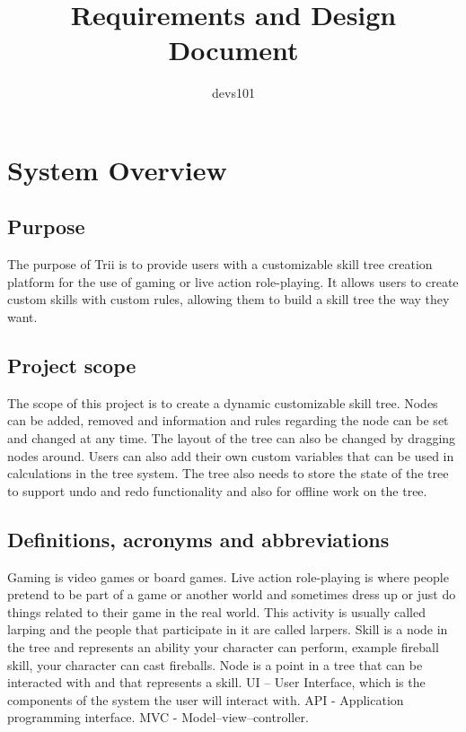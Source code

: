 \documentclass{article}
\title{Requirements and Design Document}
\author{devs101}
\begin{document}
\maketitle
\tableofcontents
\newpage

\section{System Overview}

  \subsection{Purpose}
  The purpose of Trii is to provide users with a customizable skill tree creation platform for the use of gaming or live action role-playing. It allows users to create custom skills with custom rules, allowing them to build a skill tree the way they want.
  
  \subsection{Project scope}
  The scope of this project is to create a dynamic customizable skill tree. Nodes can be added, removed and information and rules regarding the node can be set and changed at any time.\newline 
  The layout of the tree can also be changed by dragging nodes around.\newline 
  Users can also add their own custom variables that can be used in calculations in the tree system.\newline 
  The tree also needs to store the state of the tree to support undo and redo functionality and also for offline work on the tree.
  \subsection{Definitions, acronyms and abbreviations}
  Gaming is video games or board games.\newline
  Live action role-playing is where people pretend to be part of a game or another world and sometimes dress up or just do things related to their game in the real world. This activity is usually called larping and the people that participate in it are called larpers.\newline
  Skill is a node in the tree and represents an ability your character can perform, example fireball skill, your character can cast fireballs.\newline
  Node is a point in a tree that can be interacted with and that represents a skill.\newline
  UI – User Interface, which is the components of the system the user will interact with.\newline
  API - Application programming interface.\newline
  MVC - Model–view–controller.\newline
\end{document}
